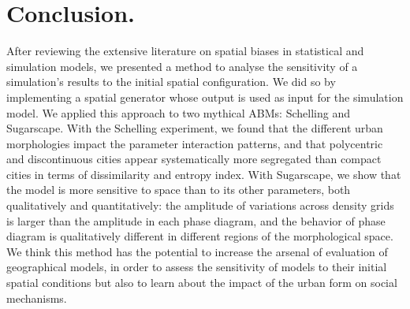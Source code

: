 \documentclass[Royal,sageh,times]{sagej}
\begin{document}


%
%
%
%
%
%



\section{Conclusion.}

After reviewing the extensive literature on spatial biases in statistical and simulation models, we presented a method to analyse the sensitivity of a simulation's results to the initial spatial configuration. We did so by implementing a spatial generator whose output is used as input for the simulation model. We applied this approach to two mythical ABMs: Schelling and Sugarscape. With the Schelling experiment, we found that the different urban morphologies impact the parameter interaction patterns, and that polycentric and discontinuous cities appear systematically more segregated than compact cities in terms of dissimilarity and entropy index. With Sugarscape, we show that the model is more sensitive to space than to its other parameters, both qualitatively and quantitatively: the amplitude of variations across density grids is larger than the amplitude in each phase diagram, and the behavior of phase diagram is qualitatively different in different regions of the morphological space. We think this method has the potential to increase the arsenal of evaluation of geographical models, in order to assess the sensitivity of models to their initial spatial conditions but also to learn about the impact of the urban form on social mechanisms.
\end{document}
